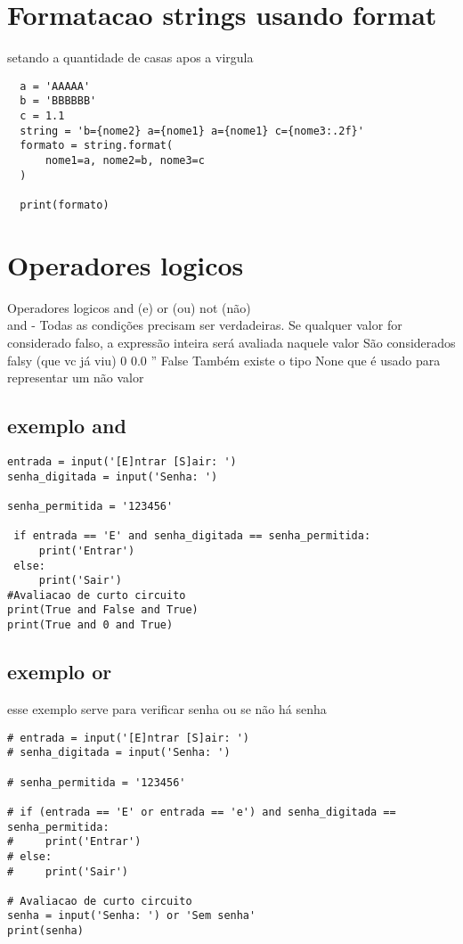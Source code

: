 \documentclass[a4paper, 16pt]{}
\begin{document}
\section{Formatacao strings usando format}  
setando a quantidade de casas apos a virgula
\begin{lstlisting}
  a = 'AAAAA'
  b = 'BBBBBB'
  c = 1.1
  string = 'b={nome2} a={nome1} a={nome1} c={nome3:.2f}'
  formato = string.format(
      nome1=a, nome2=b, nome3=c
  )
  
  print(formato)

\end{lstlisting}


\section{Operadores logicos}
     Operadores logicos
and (e) or (ou) not (não)\\
 and - Todas as condições precisam ser
 verdadeiras.
 Se qualquer valor for considerado falso,
 a expressão inteira será avaliada naquele valor
 São considerados falsy (que vc já viu)
 0 0.0 '' False
 Também existe o tipo None que é
 usado para representar um não valor\\
 \subsection{exemplo and}
\begin{lstlisting}
entrada = input('[E]ntrar [S]air: ')
senha_digitada = input('Senha: ')

senha_permitida = '123456'

 if entrada == 'E' and senha_digitada == senha_permitida:
     print('Entrar')
 else:
     print('Sair')
#Avaliacao de curto circuito
print(True and False and True)
print(True and 0 and True)
\end{lstlisting}
\subsection{exemplo or}
esse exemplo serve para verificar senha ou se não há senha
\begin{lstlisting}
# entrada = input('[E]ntrar [S]air: ')
# senha_digitada = input('Senha: ')

# senha_permitida = '123456'

# if (entrada == 'E' or entrada == 'e') and senha_digitada == senha_permitida:
#     print('Entrar')
# else:
#     print('Sair')

# Avaliacao de curto circuito
senha = input('Senha: ') or 'Sem senha'
print(senha)
\end{lstlisting} 
\end{document}
